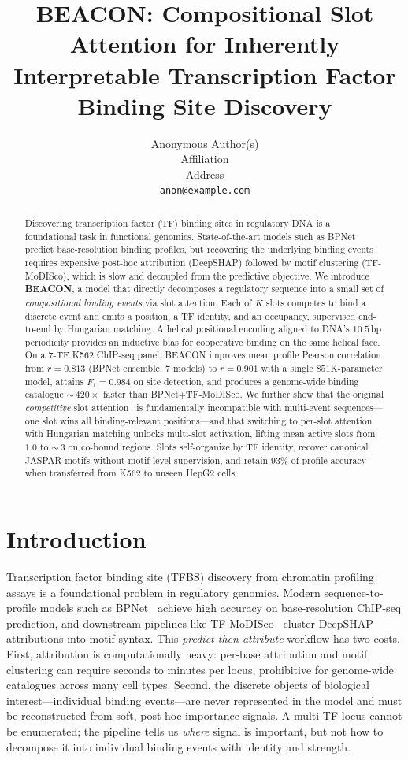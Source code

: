 \documentclass{article}
\title{BEACON: Compositional Slot Attention for Inherently\\
Interpretable Transcription Factor Binding Site Discovery}
\author{%
  Anonymous Author(s)\\
  Affiliation\\
  Address\\
  \texttt{anon@example.com}\\
}
\begin{document}
\maketitle

\begin{abstract}
Discovering transcription factor (TF) binding sites in regulatory DNA is a foundational task in functional genomics. State-of-the-art models such as BPNet predict base-resolution binding profiles, but recovering the underlying binding events requires expensive post-hoc attribution (DeepSHAP) followed by motif clustering (TF-MoDISco), which is slow and decoupled from the predictive objective. We introduce \textbf{BEACON}, a model that directly decomposes a regulatory sequence into a small set of \emph{compositional binding events} via slot attention. Each of $K$ slots competes to bind a discrete event and emits a position, a TF identity, and an occupancy, supervised end-to-end by Hungarian matching. A helical positional encoding aligned to DNA's $10.5$\,bp periodicity provides an inductive bias for cooperative binding on the same helical face. On a $7$-TF K562 ChIP-seq panel, BEACON improves mean profile Pearson correlation from $r{=}0.813$ (BPNet ensemble, $7$ models) to $r{=}0.901$ with a single $851$K-parameter model, attains $F_1{=}0.984$ on site detection, and produces a genome-wide binding catalogue $\sim$\,$420\times$ faster than BPNet$+$TF-MoDISco. We further show that the original \emph{competitive} slot attention~\citep{locatello2020slotattention} is fundamentally incompatible with multi-event sequences---one slot wins all binding-relevant positions---and that switching to per-slot attention with Hungarian matching unlocks multi-slot activation, lifting mean active slots from $1.0$ to $\sim$\,$3$ on co-bound regions. Slots self-organize by TF identity, recover canonical JASPAR motifs without motif-level supervision, and retain $93\%$ of profile accuracy when transferred from K562 to unseen HepG2 cells.
\end{abstract}

\section{Introduction}
Transcription factor binding site (TFBS) discovery from chromatin profiling assays is a foundational problem in regulatory genomics. Modern sequence-to-profile models such as BPNet~\citep{avsec2021bpnet} achieve high accuracy on base-resolution ChIP-seq prediction, and downstream pipelines like TF-MoDISco~\citep{shrikumar2018modisco} cluster DeepSHAP~\citep{lundberg2017unified} attributions into motif syntax. This \emph{predict-then-attribute} workflow has two costs. First, attribution is computationally heavy: per-base attribution and motif clustering can require seconds to minutes per locus, prohibitive for genome-wide catalogues across many cell types. Second, the discrete objects of biological interest---individual binding events---are never represented in the model and must be reconstructed from soft, post-hoc importance signals. A multi-TF locus cannot be enumerated; the pipeline tells us \emph{where} signal is important, but not how to decompose it into individual binding events with identity and strength.
\end{document}
